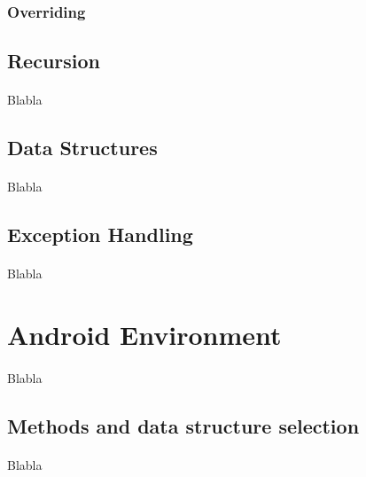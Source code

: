 \documentclass[letterpaper,twocolumn,10pt]{article}
\begin{document}
\subsubsection{Overriding} \paragraph{}

\subsection{Recursion}
\paragraph{}
Blabla

\subsection{Data Structures}
\paragraph{}
Blabla

\subsection{Exception Handling}
\paragraph{}
Blabla


\section{Android Environment}
\paragraph{}
Blabla

\subsection{Methods and data structure selection}
\paragraph{}
Blabla
\end{document}
